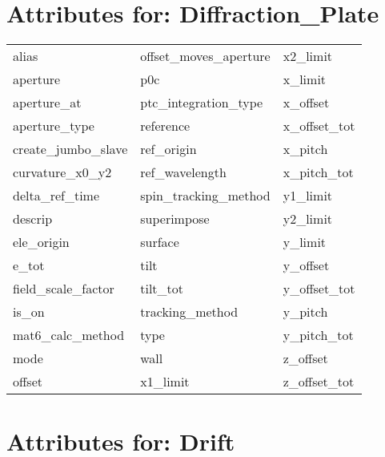  \section{Attributes for: Diffraction_Plate}
 \label{s:list.diffraction.plate}
 
 \begin{tabular}{lll} \toprule
alias                       & offset_moves_aperture       & x2_limit                    \\
aperture                    & p0c                         & x_limit                     \\
aperture_at                 & ptc_integration_type        & x_offset                    \\
aperture_type               & reference                   & x_offset_tot                \\
create_jumbo_slave          & ref_origin                  & x_pitch                     \\
curvature_x0_y2             & ref_wavelength              & x_pitch_tot                 \\
delta_ref_time              & spin_tracking_method        & y1_limit                    \\
descrip                     & superimpose                 & y2_limit                    \\
ele_origin                  & surface                     & y_limit                     \\
e_tot                       & tilt                        & y_offset                    \\
field_scale_factor          & tilt_tot                    & y_offset_tot                \\
is_on                       & tracking_method             & y_pitch                     \\
mat6_calc_method            & type                        & y_pitch_tot                 \\
mode                        & wall                        & z_offset                    \\
offset                      & x1_limit                    & z_offset_tot                \\
 \bottomrule
 \end{tabular}
 \vfill
 
 \section{Attributes for: Drift}
 \label{s:list.drift}
 
